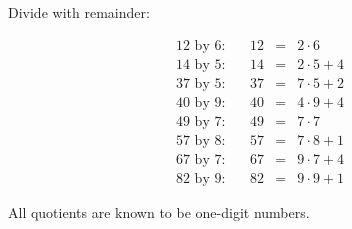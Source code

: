\begin{frame}
\begin{example}
Divide with remainder:

\[
\begin{array}{rrrcl}
12 \text{ by }6: &&12&=&2\cdot 6 \\
14 \text{ by }5: &&14&=&2\cdot 5 + 4\\
37 \text{ by }5: &&37&=&7\cdot 5 + 2 \\
40 \text{ by }9: &&40&=&4\cdot 9 + 4\\
49 \text{ by }7: &&49&=&7\cdot 7\\
57 \text{ by }8: &&57&=&7\cdot 8 + 1\\
67 \text{ by }7: &&67&=&9\cdot 7+4\\
82 \text{ by }9: &&82&=&9\cdot 9+1 
\end{array}
\]

All quotients are known to be one-digit numbers.
\end{example}

\end{frame}
